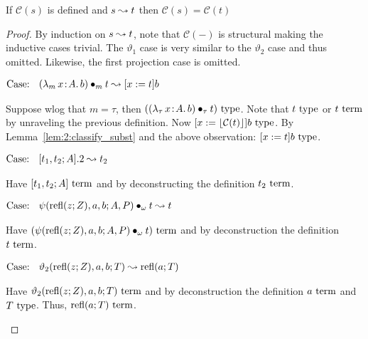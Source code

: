 \begin{lemma}
    \label{lem:2:classify_preservation_step}
    If $\mathcal{C}(s)$ is defined and $s \leadsto t$ then $\mathcal{C}(s) = \mathcal{C}(t)$
\end{lemma}
\begin{proof}
    By induction on $s \leadsto t$, note that $\mathcal{C}(-)$ is structural making the inductive cases trivial.
    The $\vartheta_1$ case is very similar to the $\vartheta_2$ case and thus omitted.
    Likewise, the first projection case is omitted.

    $\text{Case: }\begin{array}{c} ({\lambda_m}\, x\! : \! A.\, b) \bullet_{m} t \leadsto [x := t]b \end{array}$
    \begin{proofcase}
        Suppose wlog that $m = \tau$, then $(({\lambda_\tau}\, x\! : \! A.\, b) \bullet_{\tau} t)~\textnormal{type}$.
        Note that $t~\textnormal{type}$ or $t~\textnormal{term}$ by unraveling the previous definition.
        Now $[x := \lfloor \mathcal{C}(t) \rfloor]b~\textnormal{type}$.
        By Lemma~\ref{lem:2:classify_subst} and the above observation: $[x := t]b~\textnormal{type}$.
    \end{proofcase}

    $\text{Case: }\begin{array}{c} [t_1, t_2; A].2 \leadsto t_2 \end{array}$
    \begin{proofcase}
        Have $[t_1, t_2; A]~\textnormal{term}$ and by deconstructing the definition $t_2~\textnormal{term}$.
    \end{proofcase}

    $\text{Case: }\begin{array}{c} \psi(\text{refl}(z; Z), a, b; A, P) \bullet_{\omega} t \leadsto t \end{array}$
    \begin{proofcase}
        Have $(\psi(\text{refl}(z; Z), a, b; A, P) \bullet_{\omega} t)~\textnormal{term}$ and by deconstruction the definition $t~\textnormal{term}$.
    \end{proofcase}

    $\text{Case: }\begin{array}{c} \vartheta_2(\text{refl}(z; Z), a, b; T) \leadsto \text{refl}(a; T) \end{array}$
    \begin{proofcase}
        Have $\vartheta_2(\text{refl}(z; Z), a, b; T)~\textnormal{term}$ and by deconstruction the definition $a~\textnormal{term}$ and $T~\textnormal{type}$.
        Thus, $\text{refl}(a; T)~\textnormal{term}$.
    \end{proofcase}
\end{proof}

